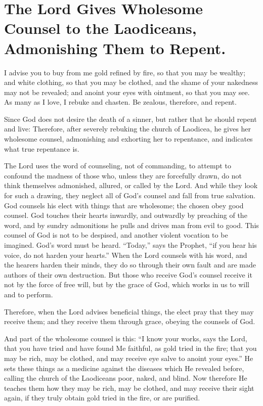 \chapter[Sermon 21. The Lord Gives Wholesome Counsel to the Laodiceans, Admonishing Them to Repent.]{The Lord Gives Wholesome Counsel to the Laodiceans, Admonishing Them to Repent.}
\label{sermon:021}

I advise you to buy from me gold refined by fire, so that you may be wealthy; and white clothing, so that you may be clothed, and the shame of your nakedness may not be revealed; and anoint your eyes with ointment, so that you may see. As many as I love, I rebuke and chasten. Be zealous, therefore, and repent.

Since God does not desire the death of a sinner, but rather that he should repent and live: Therefore, after severely rebuking the church of Laodicea, he gives her wholesome counsel, admonishing and exhorting her to repentance, and indicates what true repentance is.

The Lord uses the word of counseling, not of commanding, to attempt to confound the madness of those who, unless they are forcefully drawn, do not think themselves admonished, allured, or called by the Lord. And while they look for such a drawing, they neglect all of God’s counsel and fall from true salvation. God counsels his elect with things that are wholesome; the chosen obey good counsel. God touches their hearts inwardly, and outwardly by preaching of the word, and by sundry admonitions he pulls and drives man from evil to good. This counsel of God is not to be despised, and another violent vocation to be imagined. God’s word must be heard. “Today,” says the Prophet, “if you hear his voice, do not harden your hearts.” When the Lord counsels with his word, and the hearers harden their minds, they do so through their own fault and are made authors of their own destruction. But those who receive God’s counsel receive it not by the force of free will, but by the grace of God, which works in us to will and to perform.

Therefore, when the Lord advises beneficial things, the elect pray that they may receive them; and they receive them through grace, obeying the counsels of God.

And part of the wholesome counsel is this: “I know your works, says the Lord, that you have tried and have found Me faithful, as gold tried in the fire; that you may be rich, may be clothed, and may receive eye salve to anoint your eyes.” He sets these things as a medicine against the diseases which He revealed before, calling the church of the Laodiceans poor, naked, and blind. Now therefore He teaches them how they may be rich, may be clothed, and may receive their sight again, if they truly obtain gold tried in the fire, or are purified.

